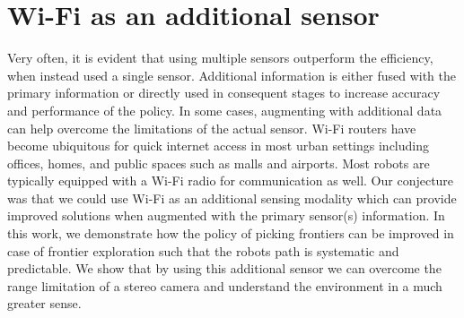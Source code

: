 \section{Wi-Fi as an additional sensor} 

Very often, it is evident that using multiple sensors outperform the efficiency, when instead used a single sensor. Additional information is either fused with the primary information or directly used in consequent stages to increase accuracy and performance of the policy. In some cases, augmenting with additional data can help overcome the limitations of the actual sensor. Wi-Fi routers have become ubiquitous for quick internet access in most urban settings including offices, homes, and public spaces such as malls and airports. Most robots are typically equipped with a Wi-Fi radio for communication as well. Our conjecture was that we could use Wi-Fi as an additional sensing modality which can provide improved solutions when augmented with the primary sensor(s) information. In this work, we demonstrate how the policy of picking frontiers can be improved in case of frontier exploration such that the robots path is systematic and predictable. We show that by using this additional sensor we can overcome the range limitation of a stereo camera and understand the environment in a much greater sense.



